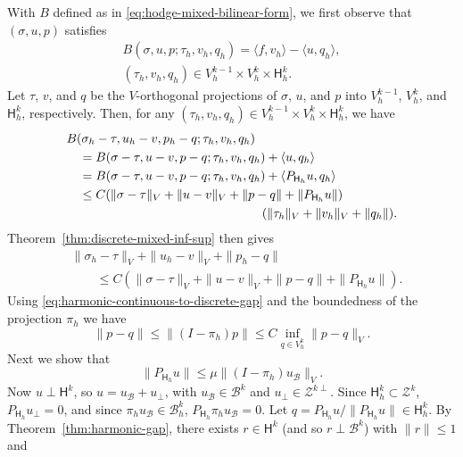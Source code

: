 \begin{Proof}
{With $B$ defined as in \eqref{eq:hodge-mixed-bilinear-form}, we first observe that $(\sigma,u,p)$ satisfies}
\[
\begin{gathered}
B(\sigma,u,p;\tau_h,v_h,q_h)=\langle f,v_h\rangle-\langle u,q_h\rangle,\\
(\tau_h,v_h,q_h)\in V_h^{k-1}\times V_h^k\times\mathsf H_h^k.
\end{gathered}
\]
{Let $\tau$, $v$, and $q$ be the $V$-orthogonal projections of $\sigma$, $u$, and $p$ into $V_h^{k-1}$, $V_h^k$, and $\mathsf H_h^k$, respectively. Then, for any $(\tau_h,v_h,q_h)\in V_h^{k-1}\times V_h^k\times\mathsf H_h^k$, we have}
\[
\begin{aligned}
&B(\sigma_h-\tau,u_h-v,p_h-q;\tau_h,v_h,q_h)\\
&\quad=B(\sigma-\tau,u-v,p-q;\tau_h,v_h,q_h)+\langle u,q_h\rangle\\
&\quad=B(\sigma-\tau,u-v,p-q;\tau_h,v_h,q_h)+\langle P_{\mathsf H_h}u,q_h\rangle\\
&\quad\leq C(\|\sigma-\tau\|_V+\|u-v\|_V+\|p-q\|+\|P_{\mathsf H_h}u\|)\\
&\hspace{55mm}(\|\tau_h\|_V+\|v_h\|_V+\|q_h\|).
\end{aligned}
\]
{Theorem~\ref{thm:discrete-mixed-inf-sup} then gives}
\begin{equation}\label{eq:mixed-error-discrete-stability}
\begin{aligned}
&\|\sigma_h-\tau\|_V+\|u_h-v\|_V+\|p_h-q\|\\
&\qquad\leq C(\|\sigma-\tau\|_V+\|u-v\|_V+\|p-q\|+\|P_{\mathsf H_h}u\|).
\end{aligned}
\end{equation}
{Using \eqref{eq:harmonic-continuous-to-discrete-gap} and the boundedness of the projection $\pi_h$ we have}
\begin{equation}\label{eq:mixed-error-harmonic-best-approximation}
\|p-q\|\leq\|(I-\pi_h)p\|\leq C\inf_{q\in V_h^k}\|p-q\|_V.
\end{equation}
{Next we show that}
\[
\|P_{\mathsf H_h}u\|\leq\mu\|(I-\pi_h)u_{\mathcal B}\|_V.
\]
{Now $u\perp\mathsf H^k$, so $u=u_{\mathcal B}+u_\perp$, with $u_{\mathcal B}\in\mathcal B^k$ and $u_\perp\in\mathcal Z^{k\perp}$. Since $\mathsf H_h^k\subset\mathcal Z^k$, $P_{\mathsf H_h}u_\perp=0$, and since $\pi_hu_{\mathcal B}\in\mathcal B_h^k$, $P_{\mathsf H_h}\pi_hu_{\mathcal B}=0$. Let $q=P_{\mathsf H_h}u/\|P_{\mathsf H_h}u\|\in\mathsf H_h^k$. By Theorem~\ref{thm:harmonic-gap}, there exists $r\in\mathsf H^k$ (and so $r\perp\mathcal B^k$) with $\|r\|\leq1$ and}

\end{Proof}
